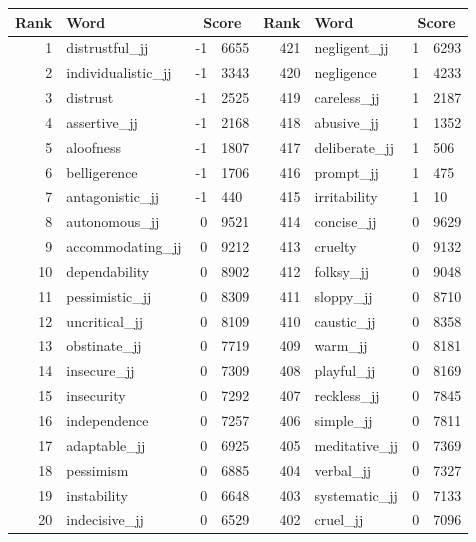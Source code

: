 \begin{table}[tbp]
    \begin{tabular}{| rlr@{.}l | rlr@{.}l |}
    \hline
    \textbf{Rank} & \textbf{Word} & \multicolumn{2}{c|}{\textbf{Score}} & \textbf{Rank} & \textbf{Word} & \multicolumn{2}{c|}{\textbf{Score}} \\
    \hline
    1 & distrustful\_jj & -1 & 6655    &    421 & negligent\_jj & 1 & 6293 \\
    2 & individualistic\_jj & -1 & 3343    &    420 & negligence & 1 & 4233 \\
    3 & distrust & -1 & 2525    &    419 & careless\_jj & 1 & 2187 \\
    4 & assertive\_jj & -1 & 2168    &    418 & abusive\_jj & 1 & 1352 \\
    5 & aloofness & -1 & 1807    &    417 & deliberate\_jj & 1 & 506 \\
    6 & belligerence & -1 & 1706    &    416 & prompt\_jj & 1 & 475 \\
    7 & antagonistic\_jj & -1 & 440    &    415 & irritability & 1 & 10 \\
    8 & autonomous\_jj & 0 & 9521    &    414 & concise\_jj & 0 & 9629 \\
    9 & accommodating\_jj & 0 & 9212    &    413 & cruelty & 0 & 9132 \\
    10 & dependability & 0 & 8902    &    412 & folksy\_jj & 0 & 9048 \\
    11 & pessimistic\_jj & 0 & 8309    &    411 & sloppy\_jj & 0 & 8710 \\
    12 & uncritical\_jj & 0 & 8109    &    410 & caustic\_jj & 0 & 8358 \\
    13 & obstinate\_jj & 0 & 7719    &    409 & warm\_jj & 0 & 8181 \\
    14 & insecure\_jj & 0 & 7309    &    408 & playful\_jj & 0 & 8169 \\
    15 & insecurity & 0 & 7292    &    407 & reckless\_jj & 0 & 7845 \\
    16 & independence & 0 & 7257    &    406 & simple\_jj & 0 & 7811 \\
    17 & adaptable\_jj & 0 & 6925    &    405 & meditative\_jj & 0 & 7369 \\
    18 & pessimism & 0 & 6885    &    404 & verbal\_jj & 0 & 7327 \\
    19 & instability & 0 & 6648    &    403 & systematic\_jj & 0 & 7133 \\
    20 & indecisive\_jj & 0 & 6529    &    402 & cruel\_jj & 0 & 7096 \\

\end{tabular}
\end{table}
